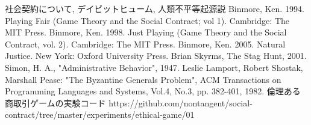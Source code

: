 \documentclass[a4j]{ujreport}
\begin{document}
\begin{thebibliography}{数字}
   社会契約について, デイビットヒューム,
   人類不平等起源説
   Binmore, Ken. 1994. Playing Fair (Game Theory and the Social Contract; vol 1). Cambridge: The MIT Press.
   Binmore, Ken. 1998. Just Playing (Game Theory and the Social Contract, vol. 2). Cambridge: The MIT Press.
   Binmore, Ken. 2005. Natural Justice. New York: Oxford University Press.
   Brian Skyrms, The Stag Hunt, 2001.
   Simon, H. A., "Administrative Behavior", 1947.
   Leslie Lamport, Robert Shostak, Marshall Pease: "The Byzantine Generals Problem", ACM Transactions on Programming Languages and Systems, Vol.4, No.3, pp. 382-401, 1982.
   倫理ある商取引ゲームの実験コード https://github.com/nontangent/social-contract/tree/master/experiments/ethical-game/01
\end{thebibliography}
\end{document}
